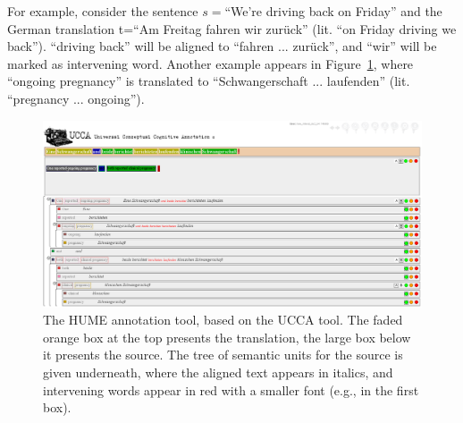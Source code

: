 \documentclass[11pt]{article}
\newcommand{\figref}[1]{Figure~\ref{#1}}
\newcommand{\bh}[1]{\footnote{\color{blue}BH: #1}}
\begin{document}
For example, consider the sentence $s=$``We're driving back on Friday'' and the German
translation t=``Am Freitag fahren wir zur\"uck'' (lit. ``on Friday driving we back'').
``driving back'' will be aligned to ``fahren ... zur\"uck'',
and ``wir'' will be marked as intervening word. Another example
appears in \figref{fig:interface}, where ``ongoing pregnancy'' is translated to
``Schwangerschaft ... laufenden'' (lit. ``pregnancy ... ongoing'').






\begin{figure}[t]
    \begin{center}
    \includegraphics[width=1\textwidth]{hume_interface.png}
    \caption{The HUME annotation tool, based on the UCCA tool. The faded orange box at the top
      presents the translation, the large box below it presents the source. The tree of semantic units
      for the source is given underneath, where the aligned text appears in italics, and intervening words
      appear in red with a smaller font (e.g., in the first box).}
    \label{fig:interface}
    \end{center}
\end{figure}
\end{document}
